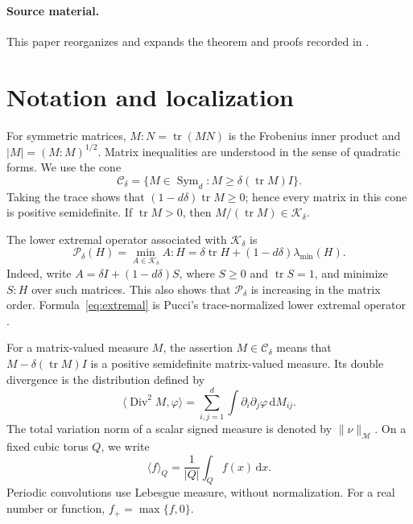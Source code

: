 \documentclass[11pt,a4paper,reqno]{amsart}
\theoremstyle{plain}
\theoremstyle{remark}
\numberwithin{equation}{section}
\newcommand{\Kdelta}{\mathcal K_\delta}
\newcommand{\Cdelta}{\mathcal C_\delta}
\newcommand{\Pdelta}{\mathcal P_\delta}
\newcommand{\dd}{\,\mathrm d}
\newcommand{\norm}[1]{\lVert#1\rVert}
\newcommand{\avg}[1]{\langle#1\rangle_Q}
\newcommand{\TV}[1]{\norm{#1}_{\mathcal M}}
\DeclareMathOperator{\tr}{tr}
\DeclareMathOperator{\Div}{Div}
\DeclareMathOperator{\Sym}{Sym}
\begin{document}
\paragraph{Source material.}
This paper reorganizes and expands the theorem and proofs recorded in \cite{Source}.

\section{Notation and localization}\label{sec:notation}
For symmetric matrices, $M:N=\tr(MN)$ is the Frobenius inner product and $|M|=(M:M)^{1/2}$. Matrix inequalities are understood in the sense of quadratic forms. We use the cone
\begin{equation}\label{eq:cone}
 \Cdelta=\{M\in\Sym_d:M\ge\delta(\tr M)I\}.
\end{equation}
Taking the trace shows that $(1-d\delta)\tr M\ge0$; hence every matrix in this cone is positive semidefinite. If $\tr M>0$, then $M/(\tr M)\in\Kdelta$.

The lower extremal operator associated with $\Kdelta$ is
\begin{equation}\label{eq:extremal}
 \Pdelta(H)=\min_{A\in\Kdelta} A:H
 =\delta\tr H+(1-d\delta)\lambda_{\min}(H).
\end{equation}
Indeed, write $A=\delta I+(1-d\delta)S$, where $S\ge0$ and $\tr S=1$, and minimize $S:H$ over such matrices. This also shows that $\Pdelta$ is increasing in the matrix order. Formula~\eqref{eq:extremal} is Pucci's trace-normalized lower extremal operator \cite[\S2, equation~(9$'$), p.~145]{PucciExtremal1966}.

For a matrix-valued measure $M$, the assertion $M\in\Cdelta$ means that $M-\delta(\tr M)I$ is a positive semidefinite matrix-valued measure. Its double divergence is the distribution defined by
\[
 \langle\Div^2M,\varphi\rangle
 =\sum_{i,j=1}^d\int \partial_i\partial_j\varphi\dd M_{ij}.
\]
The total variation norm of a scalar signed measure is denoted by $\TV{\nu}$. On a fixed cubic torus $Q$, we write
\[
 \avg{f}=\frac1{|Q|}\int_Q f(x)\dd x.
\]
Periodic convolutions use Lebesgue measure, without normalization. For a real number or function, $f_+=\max\{f,0\}$.
\end{document}
